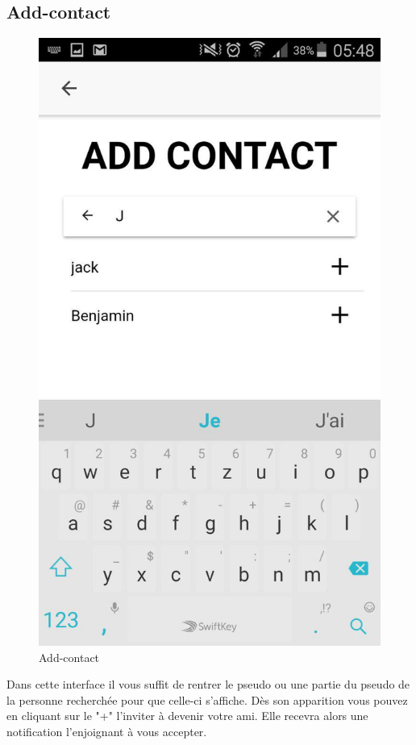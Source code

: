 \documentclass[french]{article}
\begin{document}
	\subsection{Add-contact}
		\begin{figure}[H]
			\centering
			\includegraphics[scale=0.4]{../screenshot/screenshot-add-contact}
			\caption{Add-contact}
			\label{Add-contact}
		\end{figure} 
	Dans cette interface il vous suffit de rentrer le pseudo ou une partie du pseudo de la personne recherchée pour que celle-ci s'affiche. Dès son apparition vous pouvez en cliquant sur le "+" l'inviter à devenir votre ami. Elle recevra alors une notification l'enjoignant à vous accepter.
\end{document}
